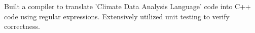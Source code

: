 \documentclass[]{rinkal_resume}
\begin{document}
\begin{minipage}[t]{0.69\textwidth}
\begin{tightemize}
\item  Built a compiler to translate 'Climate Data Analysis Language' code into C++ code using regular expressions. Extensively utilized unit testing to verify correctness.
\end{tightemize}
\sectionsep

\end{minipage} 
\end{document}
